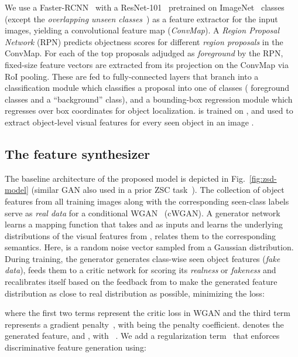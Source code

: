 \documentclass{bmvc2k}
\begin{document}
We use a Faster-RCNN~\cite{ren2016faster}  with a ResNet-101~\cite{he2016deep} pretrained on ImageNet~\cite{russakovsky2015imagenet} classes (except the {\em overlapping unseen classes}~\cite{xian2018zero}) as a feature extractor for the input images, yielding a convolutional feature map ({\em ConvMap}). A {\em Region Proposal Network} (RPN) predicts objectness scores for different {\em region proposals} in the ConvMap. For each of the top  proposals adjudged as {\em foreground} by the RPN, fixed-size feature vectors are extracted from its projection on the ConvMap via RoI pooling. These are fed to fully-connected layers that branch into a classification module  which classifies a proposal into one of  classes ( foreground classes and a ``background'' class), and a bounding-box regression module  which regresses over box coordinates for object localization.  is trained on , and used to extract object-level visual features  for every seen object in an image . 



\subsection{The feature synthesizer}
\label{sec:synthesizer}
The baseline architecture of the proposed model is depicted in Fig.~\ref{fig:zsd-model} (similar GAN also used in a prior ZSC task~\cite{xian2018feature}). The collection of object features from all training images  along with the corresponding seen-class labels serve as {\em real data} for a conditional WGAN~\cite{arjovsky2017wasserstein} (cWGAN). A generator network learns a mapping function  that takes  and  as inputs and learns the underlying distributions of the visual features from , relates them to the corresponding semantics. Here,  is a random noise vector sampled from a Gaussian distribution. During training, the generator  generates class-wise seen object features ({\em fake data}), feeds them to a critic network  for scoring its {\em realness} or {\em fakeness} and recalibrates itself based on the feedback from  to make the generated feature distribution as close to real distribution as possible, minimizing the loss:



where the first two terms represent the critic loss in WGAN and the third term represents a gradient penalty~\cite{gulrajani2017improved}, with  being the penalty coefficient.  denotes the generated feature, and , with ~\cite{xian2018feature, gulrajani2017improved}. We add a regularization term~\cite{xian2018feature} that enforces discriminative feature generation using: 
\end{document}
